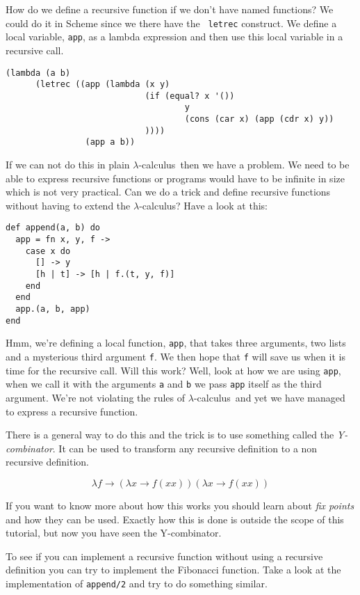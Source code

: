 \documentclass[a4paper,11pt]{article}
\newcommand{\lamc}[0]{$\lambda$-calculus}
\begin{document}
How do we define a recursive function if we don't have named
functions? We could do it in Scheme since we there have the {\tt
  letrec} construct. We define a local variable, {\tt app}, as a
lambda expression and then use this local variable in a recursive
call.

\begin{verbatim}
(lambda (a b) 
      (letrec ((app (lambda (x y) 
                            (if (equal? x '()) 
                                    y 
                                    (cons (car x) (app (cdr x) y))
                            )))) 
                (app a b))
\end{verbatim}

If we can not do this in plain \lamc\ then we have a problem. We need
to be able to express recursive functions or programs would have to be
infinite in size which is not very practical. Can we do a trick and
define recursive functions without having to extend the \lamc? Have a
look at this:

\begin{verbatim}
def append(a, b) do
  app = fn x, y, f ->
    case x do
      [] -> y
      [h | t] -> [h | f.(t, y, f)]
    end
  end
  app.(a, b, app)
end
\end{verbatim}

Hmm, we're defining a local function, {\tt app}, that takes three
arguments, two lists and a mysterious third argument {\tt f}. We then
hope that {\tt f} will save us when it is time for the recursive
call. Will this work? Well, look at how we are using {\tt app}, when
we call it with the arguments {\tt a} and {\tt b} we pass {\tt app}
itself as the third argument. We're not violating the rules of \lamc\
and yet we have managed to express a recursive function.

There is a general way to do this and the trick is to use something
called the {\em Y-combinator}. It can be used to transform any
recursive definition to a non recursive definition.

$$\lambda f \rightarrow (\lambda x \rightarrow f(x x)) (\lambda x \rightarrow f (x x))$$

If you want to know more about how this works you should learn about
{\em fix points} and how they can be used. Exactly how this is done is outside
the scope of this tutorial, but now you have seen the Y-combinator.

To see if you can implement a recursive function without using a
recursive definition you can try to implement the Fibonacci
function. Take a look at the implementation of {\tt append/2} and try
to do something similar.
\end{document}

